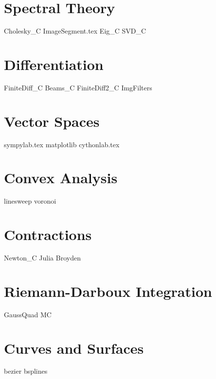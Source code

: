 \documentclass[nociteref]{newsiambook}
\begin{document}
\part{Spectral Theory}
{Cholesky_C}
{ImageSegment.tex}
{Eig_C}
{SVD_C}

\part{Differentiation}
{FiniteDiff_C}
{Beams_C}
{FiniteDiff2_C}
{ImgFilters}

\part{Vector Spaces}
{sympylab.tex}
{matplotlib}
{cythonlab.tex}

\part{Convex Analysis}

{linesweep}
{voronoi}

\part{Contractions}
{Newton_C}
{Julia}
{Broyden}

\part{Riemann-Darboux Integration}
{GaussQuad}
{MC}

% 

\part{Curves and Surfaces}
{bezier}
{bsplines}
\end{document}
